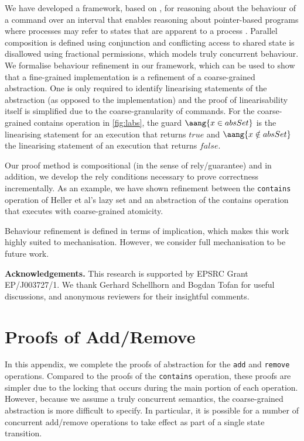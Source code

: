 \documentclass{article}
\theoremstyle{plain}
\theoremstyle{definition}
\begin{document}
We have developed a framework, based on \cite{DDH12}, for reasoning
about the behaviour of a command over an interval that enables
reasoning about pointer-based programs where processes may refer to
states that are apparent to a process \cite{HBDJ13}. Parallel
composition is defined using conjunction and conflicting access to
shared state is disallowed using fractional permissions, which models
truly concurrent behaviour.  We formalise behaviour refinement in our
framework, which can be used to show that a fine-grained
implementation is a refinement of a coarse-grained abstraction. One is
only required to identify linearising statements of the abstraction
(as opposed to the implementation) and the proof of linearisability
itself is simplified due to the coarse-granularity of commands. For
the coarse-grained contains operation in \ref{fig:labs}, the guard
$\aang{x \in absSet}$ is the linearising statement for an execution
that returns $true$ and $\aang{x \notin absSet}$ the linearising statement of
an execution that returns $false$.

Our proof method is compositional (in the sense of rely/guarantee) and
in addition, we develop the rely conditions necessary to prove
correctness incrementally. As an example, we have shown refinement
between the \texttt{contains} operation of Heller et al's lazy set and
an abstraction of the contains operation that executes with
coarse-grained
atomicity. 

Behaviour refinement is defined in terms of implication, which makes
this work highly suited to mechanisation. However, we consider full
mechanisation to be future work. 


\noindent\textbf{Acknowledgements.}
  This research is supported by EPSRC Grant EP/J003727/1. We thank
  Gerhard Schellhorn and Bogdan Tofan for useful discussions, and
  anonymous reviewers for their insightful comments.




\newpage
\appendix

\section{Proofs of Add/Remove}
\newcommand{\spec}[1]{\left\lfloor #1 \right\rfloor}
\newcommand{\NE}[1]{\underline{ #1}}

In this appendix, we complete the proofs of abstraction for the
\texttt{add} and \texttt{remove} operations. Compared to the proofs of
the \texttt{contains} operation, these proofs are simpler due to the
locking that occurs during the main portion of each
operation. However, because we assume a truly concurrent semantics,
the coarse-grained abstraction is more difficult to specify. In
particular, it is possible for a number of concurrent add/remove
operations to take effect as part of a single state transition. 
\end{document}
